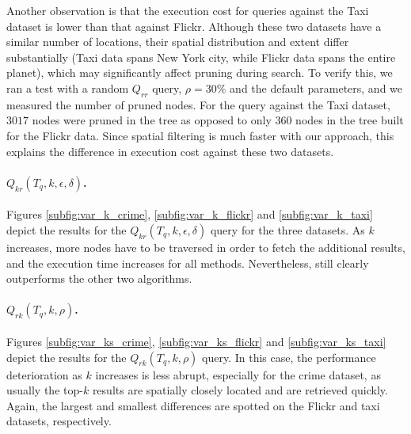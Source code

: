 Another observation is that the execution cost for queries against the Taxi dataset is lower than that against Flickr. Although these two datasets have a similar number of locations, their spatial distribution and extent differ substantially (Taxi data spans New York city, while Flickr data spans the entire planet), which may significantly affect pruning during search. To verify this, we ran a test with a random $Q_{rr}$ query, $\rho=30\%$ and the default parameters, and we measured the number of pruned nodes. For the query against the Taxi dataset, $3017$ nodes were pruned in the tree as opposed to only $360$ nodes in the tree built for the Flickr data. Since spatial filtering is much faster with our approach, this explains the difference in execution cost against these two datasets.

\paragraph{$Q_{kr}(T_q, k, \epsilon, \delta)$.} Figures \ref{subfig:var_k_crime}, \ref{subfig:var_k_flickr} and \ref{subfig:var_k_taxi} depict the results for the $Q_{kr}(T_q, k, \epsilon, \delta)$ query for the three datasets. As $k$ increases, more nodes have to be traversed in order to fetch the additional results, and the execution time increases for all methods. Nevertheless, \sbtsr still clearly outperforms the other two algorithms.

\paragraph{$Q_{rk}(T_q, k, \rho)$.} Figures \ref{subfig:var_ks_crime}, \ref{subfig:var_ks_flickr} and \ref{subfig:var_ks_taxi} depict the results for the $Q_{rk}(T_q, k, \rho)$ query. In this case, the performance deterioration as $k$ increases is less abrupt, especially for the crime dataset, as usually the top-$k$ results are spatially closely located and are retrieved quickly. Again, the largest and smallest differences are spotted on the Flickr and taxi datasets, respectively.

